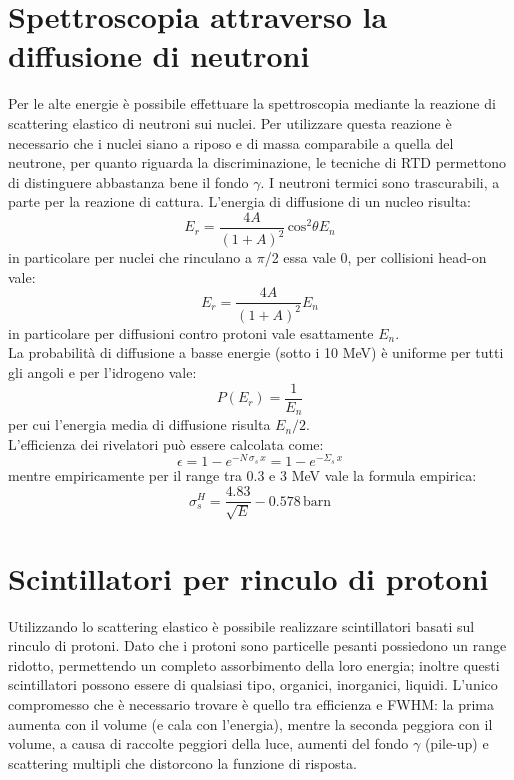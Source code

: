 \section{Spettroscopia attraverso la diffusione di neutroni}
Per le alte energie \`e possibile effettuare la spettroscopia mediante la reazione di scattering elastico di neutroni sui nuclei.
Per utilizzare questa reazione \`e necessario che i nuclei siano a riposo e di massa comparabile a quella del neutrone, per quanto
riguarda la discriminazione, le tecniche di RTD permettono di distinguere abbastanza bene il fondo $\gamma$.
I neutroni termici sono trascurabili, a parte per la reazione di cattura.
L'energia di diffusione di un nucleo risulta:
\begin{equation*}
E_r=\frac{4A}{(1+A)^2}\, \text{cos}^2\theta E_n
\end{equation*}
in particolare per nuclei che rinculano a $\pi$/2 essa vale 0, per collisioni head-on vale:
\begin{equation*}
E_r=\frac{4A}{(1+A)^2}E_n
\end{equation*}
in particolare per diffusioni contro protoni vale esattamente $E_n$.\\
La probabilit\`a di diffusione a basse energie (sotto i 10 MeV) \`e uniforme per tutti gli angoli e per l'idrogeno vale:
\begin{equation*}
P(E_r)=\frac{1}{E_n}
\end{equation*}
per cui l'energia media di diffusione risulta $E_n/2$.\\
L'efficienza dei rivelatori pu\`o essere calcolata come:
\begin{equation*}
\epsilon= 1 - e^{-N\,\sigma_s\,x} = 1 - e^{-\Sigma_s \, x}
\end{equation*}
mentre empiricamente per il range tra 0.3 e 3 MeV vale la formula empirica:
\begin{equation*}
\sigma_s^{H} = \frac{4.83}{\sqrt{E}} - 0.578 \, \text{barn}
\end{equation*}
\section{Scintillatori per rinculo di protoni}
Utilizzando lo scattering elastico \`e possibile realizzare scintillatori basati sul rinculo di protoni.
Dato che i protoni sono particelle pesanti possiedono un range ridotto, permettendo un completo assorbimento della loro energia;
inoltre questi scintillatori possono essere di qualsiasi tipo, organici, inorganici, liquidi.
L'unico compromesso che \`e necessario trovare \`e quello tra efficienza e FWHM:
la prima aumenta con il volume (e cala con l'energia), mentre la seconda peggiora con il volume, a causa di raccolte peggiori della luce,
aumenti del fondo $\gamma$ (pile-up) e scattering multipli che distorcono la funzione di risposta.

